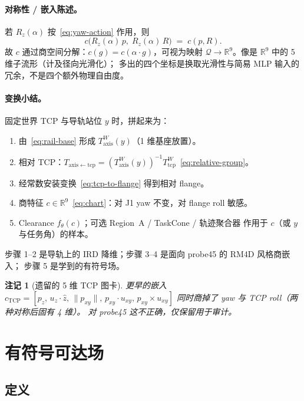 \documentclass[UTF8,a4paper,11pt,fontset=fandol]{ctexart}
\newtheorem{remark}{注记}
\newcommand{\R}{\mathbb{R}}
\newcommand{\Tcp}{T_{\mathrm{tcp}}}
\newcommand{\Taxis}{T_{\mathrm{axis}}}
\begin{document}
\paragraph{对称性 / 嵌入陈述。}
若 \(R_{z}(\alpha)\) 按~\eqref{eq:yaw-action} 作用，则
\begin{equation}
\label{eq:yaw-invariance}
  c\bigl(R_{z}(\alpha)\,p,\; R_{z}(\alpha)\,R\bigr)
  \;=\;
  c(p,R).
\end{equation}
故 \(c\) 通过商空间分解：\(c(g)=c(\alpha\cdot g)\)，可视为映射
\(\mathcal{Q}\to\R^{9}\)。像是 \(\R^{9}\) 中的 5 维子流形（计及径向光滑化）；
多出的四个坐标是换取光滑性与简易 MLP 输入的冗余，不是四个额外物理自由度。

\paragraph{变换小结。}
固定世界 TCP 与导轨站位 \(y\) 时，拼起来为：
\begin{enumerate}[leftmargin=1.4em]
  \item 由~\eqref{eq:rail-base} 形成 \(\Taxis^{W}(y)\)（1 维基座放置）。
  \item 相对 TCP：\(T_{\mathrm{axis\leftarrow tcp}}
        =(\Taxis^{W}(y))^{-1}\Tcp^{W}\)~\eqref{eq:relative-group}。
  \item 经常数安装变换~\eqref{eq:tcp-to-flange} 得到相对 flange。
  \item 商特征 \(c\in\R^{9}\)~\eqref{eq:chart}：对 J1 yaw 不变，对 flange roll 敏感。
  \item Clearance \(f_{\theta}(c)\)；可选 Region~A / TaskCone / 轨迹聚合器
        作用于 \(c\)（或 \(y\) 与任务角）的样本。
\end{enumerate}
步骤 1--2 是导轨上的 IRD 降维；步骤 3--4 是面向 probe45 的 RM4D 风格商嵌入；
步骤 5 是学到的有符号场。

\begin{remark}[遗留的 5 维 TCP 图卡]
更早的嵌入
\(c_{\mathrm{TCP}}=[p_{z},\,u_{z}\!\cdot\!\hat z,\,\|p_{xy}\|,\,
p_{xy}\!\cdot\!u_{xy},\,p_{xy}\times u_{xy}]\)
同时商掉了 yaw 与 TCP roll（两种对称后固有 4 维）。
对 probe45 这不正确，仅保留用于审计。
\end{remark}

\section{有符号可达场}
\label{sec:field}

\subsection{定义}
\label{sec:field-def}
\end{document}
